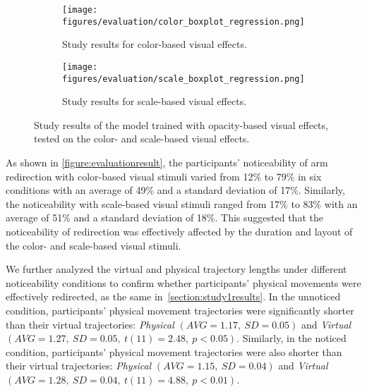 \begin{figure*}[htbp]
    \centering
    \begin{subfigure}{0.47\linewidth}
        \texttt{[image: figures/evaluation/color\_boxplot\_regression.png]}
        \caption{Study results for color-based visual effects.}
        \label{figure:evaluationresult_clr}
    \end{subfigure}
    \centering
    \begin{subfigure}{0.47\linewidth}
        \texttt{[image: figures/evaluation/scale\_boxplot\_regression.png]}
        \caption{Study results for scale-based visual effects.}
        \label{figure:evaluationresult_scl}
    \end{subfigure}
    \caption{Study results of the model trained with opacity-based visual effects, tested on the color- and scale-based visual effects.}
    \label{figure:evaluationresult}
\end{figure*}

As shown in \autoref{figure:evaluationresult}, the participants' noticeability of arm redirection with color-based visual stimuli varied from 12\% to 79\% in six conditions with an average of 49\% and a standard deviation of 17\%.
Similarly, the noticeability with scale-based visual stimuli ranged from 17\% to 83\% with an average of 51\% and a standard deviation of 18\%.
This suggested that the noticeability of redirection was effectively affected by the duration and layout of the color- and scale-based visual stimuli.

We further analyzed the virtual and physical trajectory lengths under different noticeability conditions to confirm whether participants' physical movements were effectively redirected, as the same in~\autoref{section:study1results}.
In the unnoticed condition, participants' physical movement trajectories were significantly shorter than their virtual trajectories: \textit{Physical} $(AVG = 1.17,~SD = 0.05)$ and \textit{Virtual} $(AVG = 1.27,~SD = 0.05,~t(11) = 2.48,~p < 0.05)$.
Similarly, in the noticed condition, participants' physical movement trajectories were also shorter than their virtual trajectories: \textit{Physical} $(AVG = 1.15,~SD = 0.04)$ and \textit{Virtual} $(AVG = 1.28,~SD = 0.04,~t(11) = 4.88,~p < 0.01)$.

